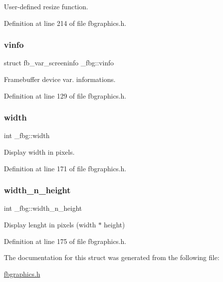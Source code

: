 User-\/defined resize function. 



Definition at line 214 of file fbgraphics.\+h.

\mbox{\label{struct__fbg_a22447f0d56680de6ff37587b44f7cf4b}} 
\subsubsection{\texorpdfstring{vinfo}{vinfo}}
{\footnotesize\ttfamily struct fb\+\_\+var\+\_\+screeninfo \+\_\+fbg\+::vinfo}



Framebuffer device var. informations. 



Definition at line 129 of file fbgraphics.\+h.

\mbox{\label{struct__fbg_a1d3c76643e4ee424f4d17e27991d5e2e}} 
\subsubsection{\texorpdfstring{width}{width}}
{\footnotesize\ttfamily int \+\_\+fbg\+::width}



Display width in pixels. 



Definition at line 171 of file fbgraphics.\+h.

\mbox{\label{struct__fbg_a1ab3f10e8c3483d7286db9850511d46d}} 
\subsubsection{\texorpdfstring{width\+\_\+n\+\_\+height}{width\_n\_height}}
{\footnotesize\ttfamily int \+\_\+fbg\+::width\+\_\+n\+\_\+height}



Display lenght in pixels (width $\ast$ height) 



Definition at line 175 of file fbgraphics.\+h.



The documentation for this struct was generated from the following file\+:\begin{DoxyCompactItemize}
\item 
\mbox{\hyperlink{fbgraphics_8h}{fbgraphics.\+h}}\end{DoxyCompactItemize}
